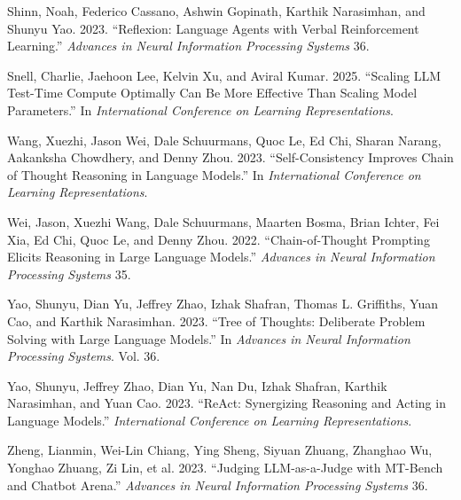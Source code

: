\documentclass[11pt]{article}
\newlength{\cslhangindent}
\newenvironment{CSLReferences}[2] %
  {\setlength{\parindent}{0pt}%
   \setlength{\parskip}{#2\baselineskip}%
   \ifodd #1\relax
     \setlength{\leftskip}{\cslhangindent}%
     \setlength{\parindent}{-\cslhangindent}%
   \fi}
  {}
\begin{document}
\begin{CSLReferences}{1}{0}
\leavevmode{}%
Shinn, Noah, Federico Cassano, Ashwin Gopinath, Karthik Narasimhan, and
Shunyu Yao. 2023. {``Reflexion: Language Agents with Verbal
Reinforcement Learning.''} \emph{Advances in Neural Information
Processing Systems} 36.

\leavevmode{}%
Snell, Charlie, Jaehoon Lee, Kelvin Xu, and Aviral Kumar. 2025.
{``Scaling {LLM} Test-Time Compute Optimally Can Be More Effective Than
Scaling Model Parameters.''} In \emph{International Conference on
Learning Representations}.

\leavevmode{}%
Wang, Xuezhi, Jason Wei, Dale Schuurmans, Quoc Le, Ed Chi, Sharan
Narang, Aakanksha Chowdhery, and Denny Zhou. 2023. {``Self-Consistency
Improves Chain of Thought Reasoning in Language Models.''} In
\emph{International Conference on Learning Representations}.

\leavevmode{}%
Wei, Jason, Xuezhi Wang, Dale Schuurmans, Maarten Bosma, Brian Ichter,
Fei Xia, Ed Chi, Quoc Le, and Denny Zhou. 2022. {``Chain-of-Thought
Prompting Elicits Reasoning in Large Language Models.''} \emph{Advances
in Neural Information Processing Systems} 35.

\leavevmode{}%
Yao, Shunyu, Dian Yu, Jeffrey Zhao, Izhak Shafran, Thomas L. Griffiths,
Yuan Cao, and Karthik Narasimhan. 2023. {``Tree of Thoughts: Deliberate
Problem Solving with Large Language Models.''} In \emph{Advances in
Neural Information Processing Systems}. Vol. 36.

\leavevmode{}%
Yao, Shunyu, Jeffrey Zhao, Dian Yu, Nan Du, Izhak Shafran, Karthik
Narasimhan, and Yuan Cao. 2023. {``{ReAct}: Synergizing Reasoning and
Acting in Language Models.''} \emph{International Conference on Learning
Representations}.

\leavevmode{}%
Zheng, Lianmin, Wei-Lin Chiang, Ying Sheng, Siyuan Zhuang, Zhanghao Wu,
Yonghao Zhuang, Zi Lin, et al. 2023. {``Judging {LLM}-as-a-Judge with
{MT-Bench} and {Chatbot Arena}.''} \emph{Advances in Neural Information
Processing Systems} 36.

\end{CSLReferences}
\end{document}
